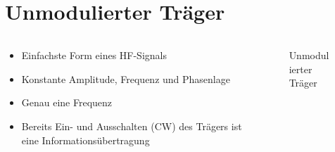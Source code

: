 
\section{Unmodulierter Träger}
\label{section:unmodulierter_traeger}
\begin{frame}%

\begin{columns}
    \begin{column}{0.48\textwidth}
    \begin{itemize}
  \item Einfachste Form eines HF-Signals
  \item Konstante Amplitude, Frequenz und Phasenlage
  \item Genau eine Frequenz
  \item Bereits Ein- und Ausschalten (CW) des Trägers ist eine Informationsübertragung
  \end{itemize}

    \end{column}
   \begin{column}{0.48\textwidth}
       
\begin{figure}
    \caption{\scriptsize Unmodulierter Träger}
    \label{e_unmodulierter_traeger}
\end{figure}


   \end{column}
\end{columns}

\end{frame}%
